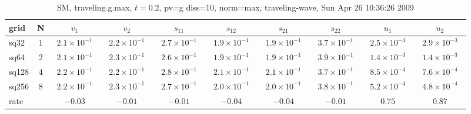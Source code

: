 \begin{table}[hbt]\tableFont %
\begin{center}
\begin{tabular}{|l|c|c|c|c|c|c|c|c|c|} \hline\hline 
grid  & N  & $v_1$ & $v_2$ & $s_{11}$ & $s_{12}$ & $s_{21}$ & $s_{22}$ &  $u_1$ & $u_2$\\ \hline 
                sq32 &     1 & ~$2.1\times10^{ -1}$~ & ~$2.2\times10^{ -1}$~ & ~$2.7\times10^{ -1}$~ & ~$1.9\times10^{ -1}$~ & ~$1.9\times10^{ -1}$~ & ~$3.7\times10^{ -1}$~ & ~$2.5\times10^{ -3}$~ & ~$2.9\times10^{ -3}$~  \\ \hline
                sq64 &     2 & ~$2.1\times10^{ -1}$~ & ~$2.3\times10^{ -1}$~ & ~$2.6\times10^{ -1}$~ & ~$1.9\times10^{ -1}$~ & ~$1.9\times10^{ -1}$~ & ~$3.9\times10^{ -1}$~ & ~$1.4\times10^{ -3}$~ & ~$1.4\times10^{ -3}$~  \\ \hline
               sq128 &     4 & ~$2.2\times10^{ -1}$~ & ~$2.2\times10^{ -1}$~ & ~$2.8\times10^{ -1}$~ & ~$2.1\times10^{ -1}$~ & ~$2.1\times10^{ -1}$~ & ~$3.7\times10^{ -1}$~ & ~$8.5\times10^{ -4}$~ & ~$7.6\times10^{ -4}$~  \\ \hline
               sq256 &     8 & ~$2.2\times10^{ -1}$~ & ~$2.3\times10^{ -1}$~ & ~$2.7\times10^{ -1}$~ & ~$2.0\times10^{ -1}$~ & ~$2.0\times10^{ -1}$~ & ~$3.8\times10^{ -1}$~ & ~$5.2\times10^{ -4}$~ & ~$4.8\times10^{ -4}$~  \\ \hline
    rate             &       &       $-0.03$          &       $-0.01$          &       $-0.01$          &       $-0.04$          &       $-0.04$          &       $-0.01$          &       $0.75$          &       $0.87$           \\ \hline\hline
\end{tabular}
\caption{SM, traveling.g.max, $t=0.2$,  pv=g diss=10, norm=max, traveling-wave, Sun Apr 26 10:36:26 2009}\label{table:traveling.g.max}
\end{center}
\end{table}
